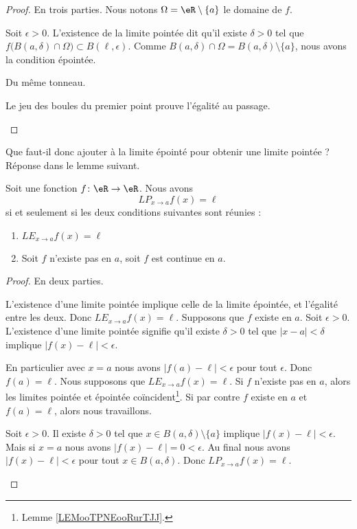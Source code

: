 \begin{proof}
	En trois parties. Nous notons \( \Omega=\eR\setminus\{ a \}\) le domaine de \( f\).
	\begin{subproof}
		Soit \( \epsilon>0\). L'existence de la limite pointée dit qu'il existe \( \delta>0\) tel que \( f\big( B(a,\delta)\cap \Omega \big)\subset  B(\ell,\epsilon)\). Comme \( B(a,\delta)\cap\Omega=B(a,\delta)\setminus\{ a \}\), nous avons la condition épointée.

		Du même tonneau.

		\spitem[Égalité]
		Le jeu des boules du premier point prouve l'égalité au passage.
	\end{subproof}
\end{proof}

Que faut-il donc ajouter à la limite épointé pour obtenir une limite pointée ? Réponse dans le lemme suivant.
\begin{lemma}
	Soit une fonction \( f\colon \eR\to \eR\). Nous avons
	\begin{equation}
		{LP}_{x\to a}f(x)=\ell
	\end{equation}
	si et seulement si les deux conditions suivantes sont réunies :
	\begin{enumerate}
		\item
		      \( {LE}_{x\to a}f(x)=\ell\)
		\item
		      Soit \( f\) n'existe pas en \( a\), soit \( f\) est continue en \( a\).
	\end{enumerate}
\end{lemma}

\begin{proof}
	En deux parties.
	\begin{subproof}
		\spitem[\( \Rightarrow\)]
		L'existence d'une limite pointée implique celle de la limite épointée, et l'égalité entre les deux. Donc \( {LE}_{x\to a}f(x)=\ell\). Supposons que \( f\) existe en \( a\). Soit \( \epsilon>0\). L'existence d'une limite pointée signifie qu'il existe \( \delta>0\) tel que \( | x-a |<\delta\) implique \( | f(x)-\ell |<\epsilon\).

		En particulier avec \( x=a\) nous avons \( | f(a)-\ell |<\epsilon\) pour tout \( \epsilon\). Donc \( f(a)=\ell\).
		\spitem[\( \Leftarrow\)]
		Nous supposons que \( {LE}_{x\to a}f(x)=\ell\). Si \( f\) n'existe pas en \( a\), alors les limites pointée et épointée coïncident\footnote{Lemme \ref{LEMooTPNEooRurTJJ}.}. Si par contre \( f\) existe en \( a\) et \( f(a)=\ell\), alors nous travaillons.

		Soit \( \epsilon>0\). Il existe \( \delta>0\) tel que \(  x\in B(a,\delta)\setminus \{ a \}  \) implique \( | f(x)-\ell |<\epsilon\). Mais si \( x=a\) nous avons \( | f(x)-\ell |=0<\epsilon\). Au final nous avons \( | f(x)-\ell |<\epsilon\) pour tout \( x\in B(a,\delta)\). Donc \( {LP}_{x\to a}f(x)=\ell\).
	\end{subproof}
\end{proof}

